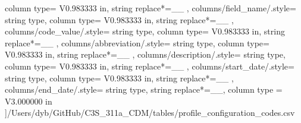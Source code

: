 \begin{landscape}
{            column type= V{0.983333 in}, 
            string replace*={_}{\_}
        },
    columns/field_name/.style={
            string type, 
            column type= V{0.983333 in}, 
            string replace*={_}{\_}
        },
    columns/code_value/.style={
            string type, 
            column type= V{0.983333 in}, 
            string replace*={_}{\_}
        },
    columns/abbreviation/.style={
            string type, 
            column type= V{0.983333 in}, 
            string replace*={_}{\_}
        },
    columns/description/.style={
            string type, 
            column type= V{0.983333 in}, 
            string replace*={_}{\_}
        },
    columns/start_date/.style={
            string type, 
            column type= V{0.983333 in}, 
            string replace*={_}{\_}
        },
    columns/end_date/.style={
            string type, 
            string replace*={_}{\_},
            column type = V{3.000000 in}
        }
    ]{/Users/dyb/GitHub/C3S_311a_CDM/tables/profile_configuration_codes.csv}
\end{landscape}
